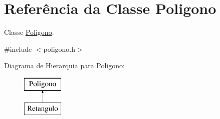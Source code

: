 \hypertarget{classPoligono}{}\section{Referência da Classe Poligono}
\label{classPoligono}


Classe \hyperlink{classPoligono}{Poligono}.  




{\ttfamily \#include $<$poligono.\+h$>$}

Diagrama de Hierarquia para Poligono\+:\begin{figure}[H]
\begin{center}
\leavevmode
\includegraphics[height=2.000000cm]{classPoligono}
\end{center}
\end{figure}
